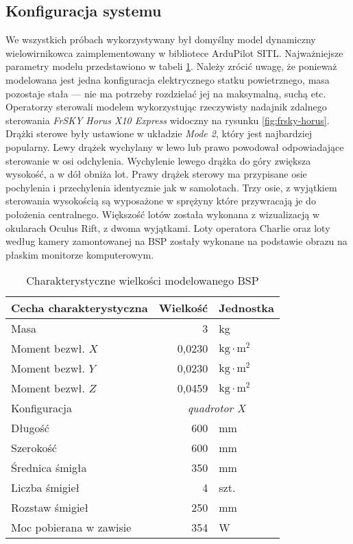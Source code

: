 \subsection{Konfiguracja systemu}
We wszystkich próbach wykorzystywany był domyślny model dynamiczny wielowirnikowca zaimplementowany w bibliotece ArduPilot SITL\cite{sitl-model}. Najważniejsze parametry modelu przedstawiono w tabeli \ref{tab:sitl-model}. Należy zrócić uwagę, że ponieważ modelowana jest jedna konfiguracja elektrycznego statku powietrznego, masa pozostaje stała --- nie ma potrzeby rozdzielać jej na maksymalną, suchą etc. Operatorzy sterowali modelem wykorzystując rzeczywisty nadajnik zdalnego sterowania \emph{FrSKY Horus X10 Express} widoczny na rysunku \ref{fig:frsky-horus}. Drążki sterowe były ustawione w układzie \emph{Mode 2}, który jest najbardziej popularny\cite{mcnabb2021}. Lewy drążek wychylany w lewo lub prawo powodował odpowiadające sterowanie w osi odchylenia. Wychylenie lewego drążka do góry zwiększa wysokość, a w dół obniża lot. Prawy drążek sterowy ma przypisane osie pochylenia i przechylenia identycznie jak w samolotach. Trzy osie, z wyjątkiem sterowania wysokością są wyposażone w sprężyny które przywracają je do położenia centralnego. Większość lotów została wykonana z wizualizacją w okularach Oculus Rift, z dwoma wyjątkami. Loty operatora Charlie oraz loty według kamery zamontowanej na BSP zostały wykonane na podstawie obrazu na płaskim monitorze komputerowym.
\begin{table}[!h] \centering
    \caption{Charakterystyczne wielkości modelowanego BSP}
    \label{tab:sitl-model}

    \begin{tabular}{|l | r|l |}
    \hline
    Cecha charakterystyczna & Wielkość & Jednostka \\ \hline \hline
    Masa & 3 & kg \\ \hline
    Moment bezwł. $ X $ & 0,0230 & $ \text{kg}\cdot\text{m}^2 $ \\ \hline
    Moment bezwł. $ Y $ & 0,0230 & $ \text{kg}\cdot\text{m}^2 $ \\ \hline
    Moment bezwł. $ Z $ & 0,0459 & $ \text{kg}\cdot\text{m}^2 $ \\ \hline
    Konfiguracja & \multicolumn{2}{c|}{\emph{quadrotor X}} \\ \hline
    Długość & 600 & mm \\ \hline
    Szerokość & 600 & mm \\ \hline
    Średnica śmigła & 350 & mm \\ \hline
    Liczba śmigieł & 4 & szt. \\ \hline
    Rozstaw śmigieł & 250 & mm \\ \hline
    Moc pobierana w zawisie & 354 & W \\ \hline
  \end{tabular}
\end{table}

